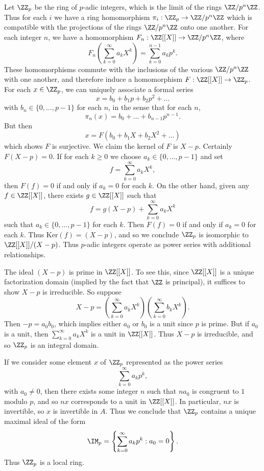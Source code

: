 Let $\ZZ_p$ be the ring of $p$-adic integers, which is the limit of the rings $\ZZ/p^n \ZZ$. Thus for each $i$ we have a ring homomorphism $\pi_i: \ZZ_p \to \ZZ/ p^n \ZZ$ which is compatible with the projections of the rings $\ZZ/p^n \ZZ$ onto one another. For each integer $n$, we have a homomorphism $F_n: \ZZ[[X]] \to \ZZ/p^n \ZZ$, where
%
\[ F_n \left( \sum_{k = 0}^\infty a_k X^k \right) = \sum_{k = 0}^{n-1} a_k p^k. \]
%
These homomorphisms commute with the inclusions of the various $\ZZ/p^n \ZZ$ with one another, and therefore induce a homomorphism $F: \ZZ[[X]] \to \ZZ_p$. For each $x \in \ZZ_p$, we can uniquely associate a formal series
%
\[ x = b_0 + b_1p + b_2p^2 + \dots \]
%
with $b_n \in \{ 0, \dots, p-1 \}$ for each $n$, in the sense that for each $n$,
%
\[ \pi_n(x) = b_0 + \dots + b_{n-1}p^{n-1}. \]
%
But then
%
\[ x = F \left( b_0 + b_1X + b_2X^2 + \dots \right) \]
%
which shows $F$ is surjective. We claim the kernel of $F$ is $X - p$. Certainly $F(X-p) = 0$. If for each $k \geq 0$ we choose $a_k \in \{ 0, \dots, p-1 \}$ and set
%
\[ f = \sum_{k = 0}^\infty a_k X^k, \]
%
then $F(f) = 0$ if and only if $a_k = 0$ for each $k$. On the other hand, given any $f \in \ZZ[[X]]$, there exists $g \in \ZZ[[X]]$ such that
%
\[ f = g (X - p) + \sum_{k = 0}^\infty a_k X^k \]
%
such that $a_k \in \{ 0, \dots, p-1 \}$ for each $k$. Then $F(f) = 0$ if and only if $a_k = 0$ for each $k$. Thus $\text{Ker}(f) = (X - p)$, and so we conclude $\ZZ_p$ is isomorphic to $\ZZ[[X]]/(X-p)$. Thus $p$-adic integers operate as power series with additional relationships.

    The ideal $(X - p)$ is prime in $\ZZ[[X]]$. To see this, since $\ZZ[[X]]$ is a unique factorization domain (implied by the fact that $\ZZ$ is principal), it suffices to show $X - p$ is irreducible. So suppose
    \[ X - p = \left( \sum_{k = 0}^\infty a_k X^k \right) \left( \sum_{k = 0}^\infty b_k X^k \right). \]
    Then $-p = a_0b_0$, which implies either $a_0$ or $b_0$ is a unit since $p$ is prime. But if $a_0$ is a unit, then $\sum_{k = 0}^\infty a_k X^k$ is a unit in $\ZZ[[X]]$. Thus $X - p$ is irreducible, and so $\ZZ_p$ is an integral domain.

    If we consider some element $x$ of $\ZZ_p$ represented as the power series
    \[ \sum_{k = 0}^\infty a_k p^k, \]
    with $a_0 \neq 0$, then there exists some integer $n$ such that $na_0$ is congruent to $1$ modulo $p$, and so $nx$ corresponds to a unit in $\ZZ[[X]]$. In particular, $nx$ is invertible, so $x$ is invertible in $A$. Thus we conclude that $\ZZ_p$ contains a unique maximal ideal of the form
    \[ \IM_p = \left\{ \sum_{k = 0}^\infty a_k p^k : a_0 = 0 \right\}. \]
    Thus $\ZZ_p$ is a local ring.

